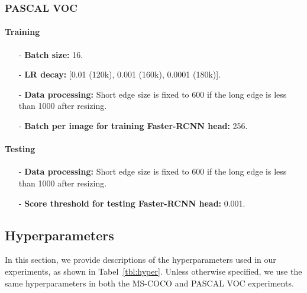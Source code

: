 \documentclass[final]{cvpr}
\begin{document}
\subsubsection{PASCAL VOC}
\paragraph{Training}
\begin{itemize}
\item[-] \textbf{Batch size:} 16. 

\item[-] \textbf{LR decay:} [0.01 (120k), 0.001 (160k), 0.0001 (180k)].
\item[-] \textbf{Data processing:} Short edge size is fixed to 600 if the long edge is less than 1000 after resizing. 
\item[-] \textbf{Batch per image for training Faster-RCNN head:} 256.
\end{itemize}

\paragraph{Testing}
\begin{itemize}
\item[-] \textbf{Data processing:} Short edge size is fixed to 600 if the long edge is less than 1000 after resizing. 
\item[-] \textbf{Score threshold for testing Faster-RCNN head:} 0.001.
\end{itemize}




\subsection{Hyperparameters}
In this section, we provide descriptions of the hyperparameters used in our experiments, as shown in Tabel~\ref{tbl:hyper}. Unless otherwise specified, we use the same hyperparameters in both the MS-COCO and PASCAL VOC experiments.
\end{document}
